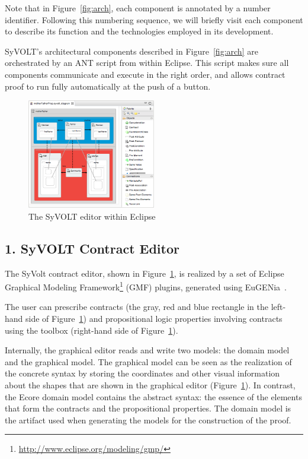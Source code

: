 Note that in Figure~\ref{fig:arch}, each component is annotated by a number
identifier. Following this numbering sequence, we will briefly visit each
component to describe its function and the technologies employed in its development.

SyVOLT's architectural components described in Figure~\ref{fig:arch} are
orchestrated by an ANT script from within Eclipse. This script makes sure all
components communicate and execute in the right order, and allows contract
proof to run fully automatically at the push of a button.

\begin{figure}
\centering
\includegraphics[width=0.5\textwidth]{figures/eclipse_frontend}
\caption{The SyVOLT editor within Eclipse}
\label{fig:eclipse_frontend}
\vspace{-.5cm}
\end{figure}


\subsection*{1. SyVOLT Contract Editor}

The SyVolt contract editor, shown in Figure~\ref{fig:eclipse_frontend}, is
realized by a set of Eclipse Graphical Modeling Framework\footnote{\url{http://www.eclipse.org/modeling/gmp/}} (GMF) plugins, generated using
EuGENia~\cite{Kolovos2010a}.

The user can prescribe contracts (the gray, red and blue rectangle in the
left-hand side of Figure~\ref{fig:eclipse_frontend}) and propositional logic properties involving
contracts using the toolbox (right-hand side of
Figure~\ref{fig:eclipse_frontend}).

Internally, the graphical editor reads and write two models: the domain model and the graphical model.
The graphical model can be seen as the realization of the concrete syntax by storing the coordinates and other visual information about the shapes that are shown in the graphical editor (Figure~\ref{fig:eclipse_frontend}). 
In contrast, the Ecore domain model contains the abstract syntax: the essence of
the elements that form the contracts and the propositional properties.
The domain model is the artifact used when generating the models for the construction of the proof.


